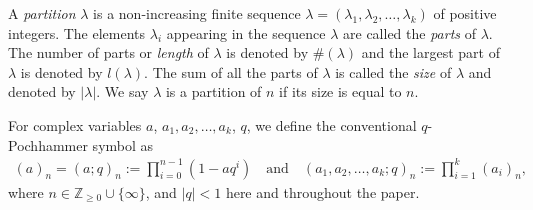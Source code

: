 \documentclass[12pt]{amsart}
\theoremstyle{definition}
\theoremstyle{remark}
\numberwithin{equation}{section}
\begin{document}


A \textit{partition} $\lambda$ is a non-increasing finite sequence $\lambda = (\lambda_1,\lambda_2,\dots,\lambda_k)$ of positive integers. The elements $\lambda_i$ appearing in the sequence $\lambda$ are called the \textit{parts} of $\lambda$. The number of parts or \textit{length} of $\lambda$ is denoted by $\#(\lambda)$ and the largest part of $\lambda$ is denoted by $l(\lambda)$. The sum of all the parts of $\lambda$ is called the \textit{size} of $\lambda$ and denoted by $|\lambda|$. We say $\lambda$ is a partition of $n$ if its size is equal to $n$.

For complex variables $a$, $a_1,a_2,\ldots,a_k$, $q$, we define the conventional $q$-Pochhammer symbol as
\begin{align*}
(a)_n = (a;q)_n := \prod\limits_{i=0}^{n-1}(1-aq^i)\quad\text{and}\quad(a_1,a_2,\ldots,a_k;q)_n := \prod\limits_{i=1}^{k}(a_i)_n,
\end{align*}
where $n\in\mathbb{Z}_{\ge 0}\cup\{\infty\}$, and $|q|<1$ here and throughout the paper.

\end{document}
